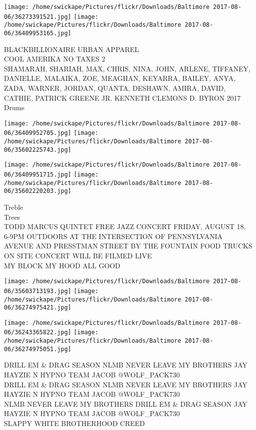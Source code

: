 \documentclass[10pt,letterpaper]{article}
\begin{document}
\texttt{[image: /home/swickape/Pictures/flickr/Downloads/Baltimore 2017-08-06/36273391521.jpg]}
\texttt{[image: /home/swickape/Pictures/flickr/Downloads/Baltimore 2017-08-06/36409953165.jpg]}

BLACKBILLIONAIRE URBAN APPAREL\\
COOL AMERIKA NO TAXES 2\\
SHAMARAH, SHARIAH, MAX, CHRIS, NINA, JOHN, ARLENE, TIFFANEY, DANIELLE, MALAIKA, ZOE, MEAGHAN, KEYARRA, BAILEY, ANYA, ZADA, WARNER, JORDAN, QUANTA, DESHAWN, AMIRA, DAVID, CATHIE, PATRICK GREENE JR. KENNETH CLEMONS D. BYRON 2017\\
Drums\\
\pagebreak

\texttt{[image: /home/swickape/Pictures/flickr/Downloads/Baltimore 2017-08-06/36409952705.jpg]}
\texttt{[image: /home/swickape/Pictures/flickr/Downloads/Baltimore 2017-08-06/35602225743.jpg]}

\texttt{[image: /home/swickape/Pictures/flickr/Downloads/Baltimore 2017-08-06/36409951715.jpg]}
\texttt{[image: /home/swickape/Pictures/flickr/Downloads/Baltimore 2017-08-06/35602220203.jpg]}

Treble\\
Trees\\
TODD MARCUS QUINTET FREE JAZZ CONCERT FRIDAY, AUGUST 18, 6{-}9PM OUTDOORS AT THE INTERSECTION OF PENNSYLVANIA AVENUE AND PRESSTMAN STREET BY THE FOUNTAIN FOOD TRUCKS ON SITE CONCERT WILL BE FILMED LIVE\\
MY BLOCK MY HOOD ALL GOOD\\
\pagebreak

\texttt{[image: /home/swickape/Pictures/flickr/Downloads/Baltimore 2017-08-06/35603713193.jpg]}
\texttt{[image: /home/swickape/Pictures/flickr/Downloads/Baltimore 2017-08-06/36274975421.jpg]}

\texttt{[image: /home/swickape/Pictures/flickr/Downloads/Baltimore 2017-08-06/36243365822.jpg]}
\texttt{[image: /home/swickape/Pictures/flickr/Downloads/Baltimore 2017-08-06/36274975051.jpg]}

DRILL EM \& DRAG SEASON NLMB NEVER LEAVE MY BROTHERS JAY HAYZIE N HYPNO TEAM JACOB @WOLF\_PACK730\\
DRILL EM \& DRAG SEASON NLMB NEVER LEAVE MY BROTHERS JAY HAYZIE N HYPNO TEAM JACOB @WOLF\_PACK730\\
NLMB NEVER LEAVE MY BROTHERS DRILL EM \& DRAG SEASON JAY HAYZIE N HYPNO TEAM JACOB @WOLF\_PACK730\\
SLAPPY  WHITE BROTHERHOOD CREED\\
\pagebreak
\end{document}
